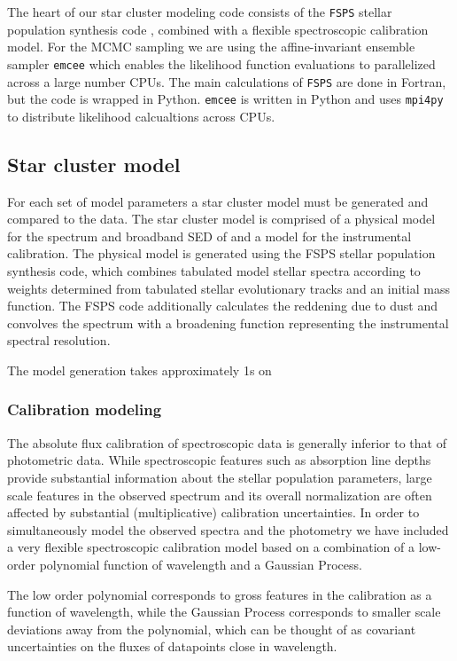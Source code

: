 \documentclass[11pt,preprint]{aastex}
\begin{document}
The heart of our star cluster modeling code consists of the \texttt{FSPS} stellar population synthesis code \citep{fsps}, combined with a flexible spectroscopic calibration model.  
For the MCMC sampling we are using the affine-invariant ensemble sampler \texttt{emcee} \citep{emcee} which enables the likelihood function evaluations to parallelized across a large number CPUs. 
The main calculations of \texttt{FSPS} are done in Fortran, but the code is wrapped in Python.  \texttt{emcee} is written in Python and uses \texttt{mpi4py} to distribute likelihood calcualtions across CPUs.

\subsection{Star cluster model}
For each set of model parameters a star cluster model must be generated and compared to the data. 
The star cluster model is comprised of a physical model for the spectrum and broadband SED of and a model for the instrumental calibration.  
The physical model is generated using the FSPS stellar population synthesis code, which combines tabulated model stellar spectra according to weights determined from tabulated stellar evolutionary tracks and an initial mass function.  
The FSPS code additionally calculates the reddening due to dust and convolves the spectrum with a broadening function representing the instrumental spectral resolution.

The model generation takes approximately 1s on 

\subsubsection{Calibration modeling}
The absolute flux calibration of spectroscopic data is generally inferior to that of photometric data.  
While spectroscopic features such as absorption line depths provide substantial information about the stellar population parameters, large scale features in the observed spectrum and its overall normalization are often affected by substantial (multiplicative) calibration uncertainties. 
In order to simultaneously model the observed spectra and the photometry we have included a very flexible spectroscopic calibration model based on a combination of a low-order polynomial function of wavelength and a Gaussian Process.

The low order polynomial corresponds to gross features in the calibration as a function of wavelength, while the Gaussian Process corresponds to smaller scale deviations away from the polynomial, which can be thought of as covariant uncertainties on the fluxes of datapoints close in wavelength.
\end{document}
